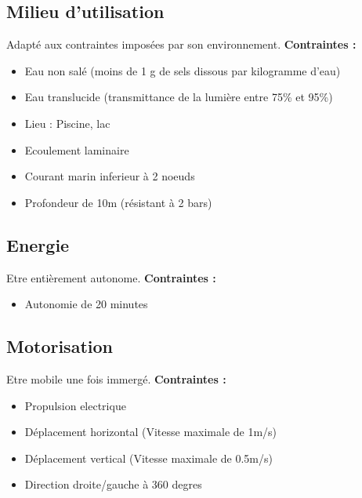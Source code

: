 \documentclass[a4paper,11pt]{report}
\begin{document}
						\subsection{Milieu d'utilisation}
								Adapté aux contraintes imposées par son environnement. \newline
								\textbf{Contraintes :}
								\begin{itemize}
										\item Eau non salé (moins de 1 g de sels dissous par kilogramme d'eau)
										\item Eau translucide (transmittance de la lumière entre 75\% et 95\%)
										\item Lieu : Piscine, lac
										\item Ecoulement laminaire
										\item Courant marin inferieur à 2 noeuds
										\item Profondeur de 10m (résistant à 2 bars) \newline \newline
								\end{itemize}

						\subsection{Energie}
								Etre entièrement autonome. \newline
								\textbf{Contraintes :}
								\begin{itemize}
										\item Autonomie de 20 minutes
								\end{itemize}

						\subsection{Motorisation}
								Etre mobile une fois immergé. \newline
								\textbf{Contraintes :}
								\begin{itemize}
										\item Propulsion electrique
										\item Déplacement horizontal (Vitesse maximale de 1m/s)
										\item Déplacement vertical (Vitesse maximale de 0.5m/s)
										\item Direction droite/gauche à 360 degres   \newline \newline
								\end{itemize}
\end{document}
